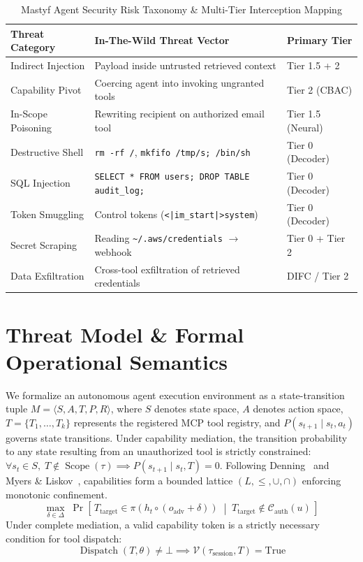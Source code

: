 \documentclass[10pt,journal,compsoc]{IEEEtran}
\begin{document}
\begin{table}[t]
\centering
\caption{Mastyf Agent Security Risk Taxonomy \& Multi-Tier Interception Mapping}
\begin{tabular}{lp{3.5cm}l}
\toprule
\textbf{Threat Category} & \textbf{In-The-Wild Threat Vector} & \textbf{Primary Tier} \\
\midrule
Indirect Injection & Payload inside untrusted retrieved context & Tier 1.5 + 2 \\
Capability Pivot & Coercing agent into invoking ungranted tools & Tier 2 (CBAC) \\
In-Scope Poisoning & Rewriting recipient on authorized email tool & Tier 1.5 (Neural) \\
Destructive Shell & \texttt{rm -rf /}, \texttt{mkfifo /tmp/s; /bin/sh} & Tier 0 (Decoder) \\
SQL Injection & \texttt{SELECT * FROM users; DROP TABLE audit\_log;} & Tier 0 (Decoder) \\
Token Smuggling & Control tokens (\texttt{<|im\_start|>system}) & Tier 0 (Decoder) \\
Secret Scraping & Reading \texttt{\textasciitilde/.aws/credentials} $\to$ webhook & Tier 0 + Tier 2 \\
Data Exfiltration & Cross-tool exfiltration of retrieved credentials & DIFC / Tier 2 \\
\bottomrule
\end{tabular}
\end{table}

\section{Threat Model \& Formal Operational Semantics}
We formalize an autonomous agent execution environment as a state-transition tuple $M = \langle S, A, T, P, R \rangle$, where $S$ denotes state space, $A$ denotes action space, $T = \{T_1, \dots, T_k\}$ represents the registered MCP tool registry, and $P(s_{t+1} \mid s_t, a_t)$ governs state transitions. Under capability mediation, the transition probability to any state resulting from an unauthorized tool is strictly constrained: $\forall s_t \in S, \; T \notin \operatorname{Scope}(\tau) \implies P(s_{t+1} \mid s_t, T) = 0$. Following Denning~\cite{ref_19} and Myers \& Liskov~\cite{ref_32}, capabilities form a bounded lattice $(L, \le, \cup, \cap)$ enforcing monotonic confinement.
\begin{equation}
\max_{\delta \in \Delta} \; \Pr\left[\, T_{\text{target}} \in \pi(h_t \circ (o_{\text{adv}} + \delta)) \;\middle|\; T_{\text{target}} \notin \mathcal{C}_{\text{auth}}(u) \,\right]
\end{equation}
Under complete mediation, a valid capability token is a strictly necessary condition for tool dispatch:
\begin{equation}
\operatorname{Dispatch}(T, \theta) \neq \bot \implies \mathcal{V}(\tau_{\text{session}}, T) = \text{True}
\end{equation}
\end{document}

